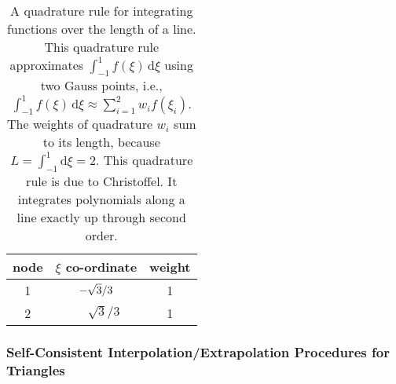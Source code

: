 \begin{table}
    \begin{center}
        \begin{tabular}{|c|cc|}
            \hline
            node & $\xi$ co-ordinate & weight \\ \hline        
            1 & $-\sqrt{3} / 3^{\vphantom{|^|}}$ & 1 \\ 
            2 & $\phantom{-}\sqrt{3} / 3$ & 1 \\ 
            \hline
        \end{tabular}
    \end{center}
    \caption{A quadrature rule for integrating functions over the length of a line.  This quadrature rule approximates $\int_{-1}^1 f(\xi) \, \mathrm{d}\xi$ using two Gauss points, i.e., $\int_{-1}^1 f(\xi) \, \mathrm{d}\xi \approx \sum_{i=1}^2 w_i f(\xi_i)$.  The weights of quadrature $w_i$ sum to its length, because $L = \int_{-1}^1 \mathrm{d} \xi = 2$.  This quadrature rule is due to Christoffel.  It integrates polynomials along a line exactly up through second order.}
    \label{tab:2nodeRod}
\end{table}

\subsubsection{Self-Consistent Interpolation\slash Extrapolation Procedures for Triangles}

